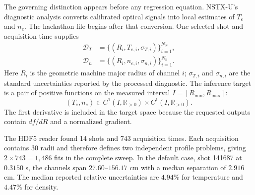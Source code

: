 \documentclass[10pt,twocolumn]{article}
\newcommand{\Data}{\mathcal{D}}
\newcommand{\R}{\mathbb{R}}
\newcommand{\Te}{T_e}
\newcommand{\nelec}{n_e}
\begin{document}
The governing distinction appears before any regression equation.  NSTX-U's
diagnostic analysis converts calibrated optical signals into local estimates
of $\Te$ and $\nelec$.  The hackathon file begins after that conversion.  One
selected shot and acquisition time supplies
\begin{align}
\Data_T&=\{(R_i,T_{e,i},\sigma_{T,i})\}_{i=1}^{N_T},\\
\Data_n&=\{(R_i,n_{e,i},\sigma_{n,i})\}_{i=1}^{N_n}. \label{eq:data}
\end{align}
Here $R_i$ is the geometric machine major radius of channel $i$;
$\sigma_{T,i}$ and $\sigma_{n,i}$ are the standard uncertainties reported by
the processed diagnostic.  The inference target is a pair of positive
functions on the measured interval $I=[R_{\min},R_{\max}]$:
\begin{equation}
(\Te,\nelec)\in C^1(I,\R_{>0})\times C^1(I,\R_{>0}).
\end{equation}
The first derivative is included in the target space because the requested
outputs contain $df/dR$ and a normalized gradient.

The HDF5 reader found 14 shots and 743 acquisition times.  Each acquisition
contains 30 radii and therefore defines two independent profile problems,
giving $2\times743=1{,}486$ fits in the complete sweep.  In the default case,
shot 141687 at $0.3150$ s, the channels span $27.60$--$156.17$ cm with a
median separation of $2.916$ cm.  The median reported relative uncertainties
are $4.94\%$ for temperature and $4.47\%$ for density.
\end{document}
